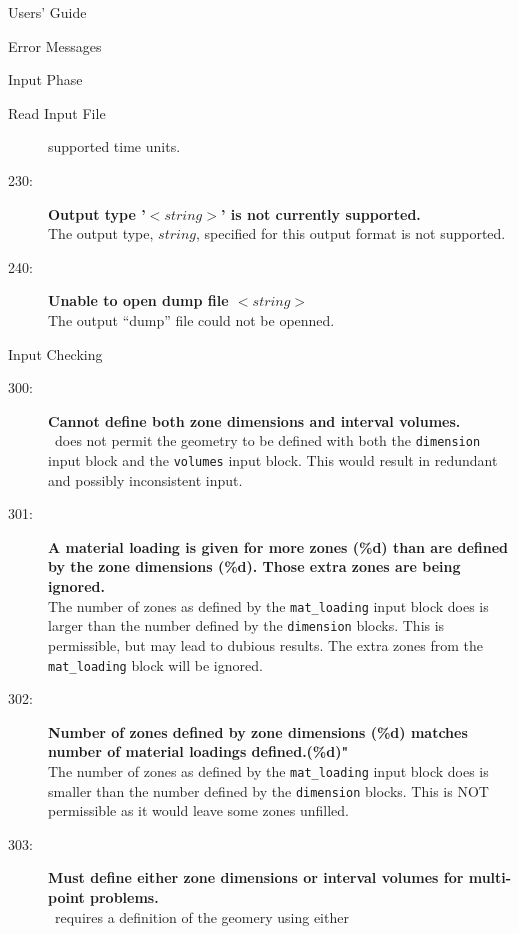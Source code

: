\begin{chapter}{Users' Guide\label{app:user.guide}}
\begin{section}{Error Messages}
\begin{subsection}{Input Phase}
\begin{subsubsection}{Read Input File}
\begin{description}
          supported time units.
        \item[230:]\textbf{Output type '$<\!\!string\!\!>$' is not
            currently supported.}\ \\
          The output type, $string$, specified for this output
          format is not supported.
        \item[240:]\textbf{Unable to open dump file
            $<\!\!string\!\!>$}\ \\
          The output ``dump'' file could not be openned.
        \end{description}
      \end{subsubsection}
      
      \begin{subsubsection}{Input Checking}
        \begin{description}
        \item[300:]\textbf{Cannot define both zone dimensions and
            interval volumes.}\ \\
          \ALARA\ does not permit the geometry to be defined with both
          the \texttt{dimension} input block and the \texttt{volumes}
          input block.  This would result in redundant and possibly
          inconsistent input.
        \item[301:]\textbf{A material loading is given for more
            zones (\%d) than are defined by the zone dimensions
            (\%d).  Those extra
            zones are being ignored.}\ \\
          The number of zones as defined by the
          \texttt{mat\_loading} input block does is larger than the
          number defined by the \texttt{dimension} blocks.  This is
          permissible, but may lead to dubious results.  The extra
          zones from the \texttt{mat\_loading} block will be ignored.
        \item[302:]\textbf{Number of zones defined by zone
            dimensions (\%d) matches number of material
            loadings defined.(\%d)"}\ \\
          The number of zones as defined by the
          \texttt{mat\_loading} input block does is smaller than the
          number defined by the \texttt{dimension} blocks.  This is
          NOT permissible as it would leave some zones unfilled.
        \item[303:]\textbf{Must define either zone dimensions or
            interval volumes for multi-point problems.}\ \\
          \ALARA\ requires a definition of the geomery using either

\end{description}
\end{subsubsection}
\end{subsection}
\end{section}
\end{chapter}
